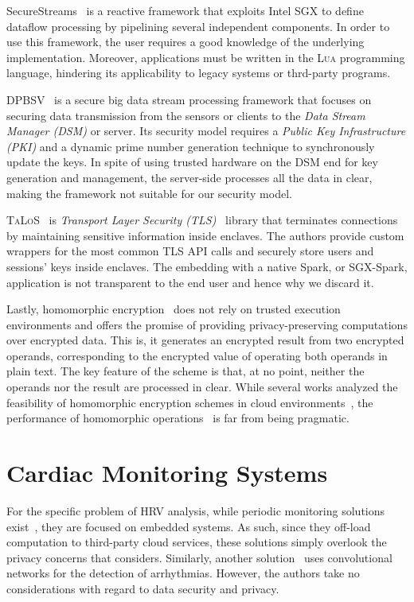 SecureStreams~\cite{Havet2017} is a reactive framework that exploits Intel SGX to define dataflow processing by pipelining several independent components. 
In order to use this framework, the user requires a good knowledge of the underlying implementation. 
Moreover, applications must be written in the \textsc{Lua} programming language, hindering its applicability to legacy systems or thrd-party programs.

\textsc{DPBSV}~\cite{Puthal2015} is a secure big data stream processing framework that focuses on securing data transmission from the sensors or clients to the \textit{Data Stream Manager (DSM)} or server. 
Its security model requires a \textit{Public Key Infrastructure (PKI)} and a dynamic prime number generation technique to synchronously update the keys. 
In spite of using trusted hardware on the DSM end for key generation and management, the server-side processes all the data in clear, making the framework not suitable for our security model. 

\textsc{TaLoS}~\cite{Aublin2017} is \textit{Transport Layer Security (TLS)}~\cite{Dierks2008} library that terminates connections by maintaining sensitive information inside enclaves. 
The authors provide custom wrappers for the most common \textsc{TLS} API calls and securely store users and sessions' keys inside enclaves.
The embedding with a native Spark, or SGX-Spark, application is not transparent to the end user and hence why we discard it.

Lastly, homomorphic encryption~\cite{Gentry2009} does not rely on trusted execution environments and offers the promise of providing privacy-preserving computations over encrypted data.
This is, it generates an encrypted result from two encrypted operands, corresponding to the encrypted value of operating both operands in plain text.
The key feature of the scheme is that, at no point, neither the operands nor the result are processed in clear.
While several works analyzed the feasibility of homomorphic encryption schemes in cloud environments~\cite{Tetali2013,Stephen2016}, the performance of homomorphic operations~\cite{Gottel2018} is far from being pragmatic.

\section{Cardiac Monitoring Systems} \label{sec:related:cardiac}
For the specific problem of HRV analysis, while periodic monitoring solutions exist~\cite{Renevey2018}, they are focused on embedded systems.
As such, since they off-load computation to third-party cloud services, these solutions simply overlook the privacy concerns that \projName considers.
Similarly, another solution~\cite{VanZaen2019} uses convolutional networks for the detection of arrhythmias.
However, the authors take no considerations with regard to data security and privacy.

